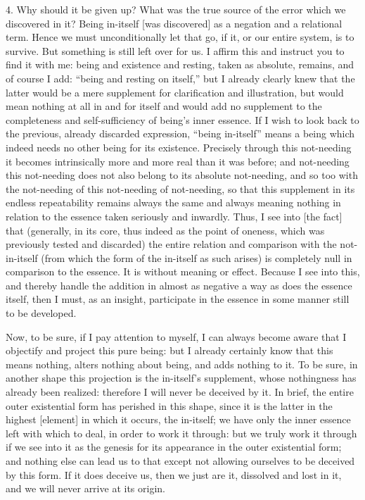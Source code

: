 4. Why should it be given up?
What was the true source of the error
which we discovered in it?
Being in-itself [was discovered] as
a negation and a relational term.
Hence we must unconditionally let that go,
if it, or our entire system, is to survive.
But something is still left over for us.
I affirm this and instruct you to find it with me:
being and existence and resting,
taken as absolute, remains,
and of course I add:
“being and resting on itself,”
but I already clearly knew that
the latter would be a mere supplement
for clarification and illustration,
but would mean nothing at all
in and for itself
and would add no supplement to the
completeness and self-sufficiency of
being's inner essence.
If I wish to look back to the previous,
already discarded expression,
“being in-itself” means a being
which indeed needs no other being for its existence.
Precisely through this not-needing
it becomes intrinsically more and more
real than it was before;
and not-needing this not-needing does not also
belong to its absolute not-needing,
and so too with the not-needing of
this not-needing of not-needing,
so that this supplement in its
endless repeatability remains always the same
and always meaning nothing in relation to
the essence taken seriously and inwardly.
Thus, I see into [the fact] that
(generally, in its core,
thus indeed as the point of oneness,
which was previously tested and discarded)
the entire relation and comparison
with the not-in-itself
(from which the form of the in-itself as such arises)
is completely null in comparison to the essence.
It is without meaning or effect.
Because I see into this,
and thereby handle the addition
in almost as negative a way
as does the essence itself,
then I must, as an insight,
participate in the essence
in some manner still to be developed.

Now, to be sure, if I pay attention to myself,
I can always become aware that I objectify
and project this pure being:
but I already certainly know
that this means nothing,
alters nothing about being,
and adds nothing to it.
To be sure, in another shape
this projection is the in-itself's supplement,
whose nothingness has already been realized:
therefore I will never be deceived by it.
In brief, the entire outer existential form
has perished in this shape,
since it is the latter in the highest [element]
in which it occurs, the in-itself;
we have only the inner essence left with which to deal,
in order to work it through:
but we truly work it through
if we see into it as the genesis
for its appearance in the outer existential form;
and nothing else can lead us to that except
not allowing ourselves to be deceived by this form.
If it does deceive us, then we just are it,
dissolved and lost in it,
and we will never arrive at its origin.


